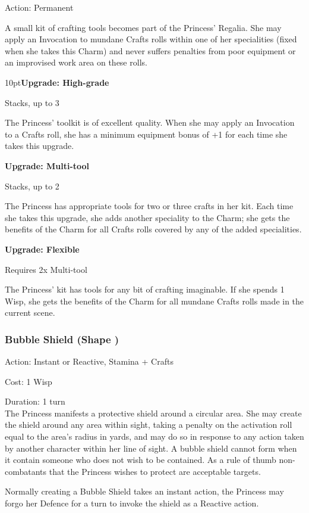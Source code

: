 \noindent Action: Permanent

A small kit of crafting tools becomes part of the Princess' Regalia. She may apply an Invocation to mundane Crafts rolls within one of her specialities (fixed when she takes this Charm) and never suffers penalties from poor equipment or an improvised work area on these rolls.
\begin{myindentpar}{10pt}\textbf{Upgrade: High-grade}

Stacks, up to 3

The Princess' toolkit is of excellent quality. When she may apply an Invocation to a Crafts roll, she has a minimum equipment bonus of +1 for each time she takes this upgrade.

\textbf{Upgrade: Multi-tool}

Stacks, up to 2

The Princess has appropriate tools for two or three crafts in her kit. Each time she takes this upgrade, she adds another speciality to the Charm; she gets the benefits of the Charm for all Crafts rolls covered by any of the added specialities.

\textbf{Upgrade: Flexible}

Requires 2x Multi-tool

The Princess' kit has tools for any bit of crafting imaginable. If she spends 1 Wisp, she gets the benefits of the Charm for all mundane Crafts rolls made in the current scene.\end{myindentpar}
\subsubsection*{Bubble Shield (Shape \textbullet)}

\noindent Action: Instant or Reactive, Stamina + Crafts

\noindent Cost: 1 Wisp

\noindent Duration: 1 turn \\

\noindent The Princess manifests a protective shield around a circular area. She may create the shield around any area within sight, taking a penalty on the activation roll equal to the area’s radius in yards, and may do so in
response to any action taken by another character within her line of sight. A bubble shield cannot form when it contain someone who does not wish to be contained. As a rule of thumb non-combatants that the Princess wishes to protect are acceptable targets. 

Normally creating a Bubble Shield takes an instant action, the Princess may forgo her Defence for a turn to invoke the shield as a Reactive action. 

